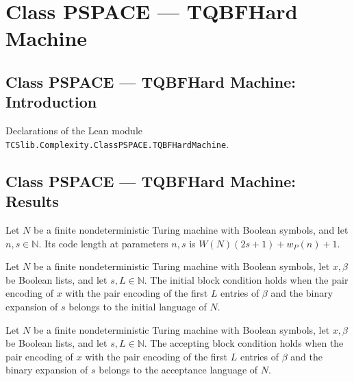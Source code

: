 \section{Class PSPACE --- TQBFHard Machine}
\subsection*{Class PSPACE --- TQBFHard Machine: Introduction}

Declarations of the Lean module \texttt{TCSlib.Complexity.ClassPSPACE.TQBFHardMachine}.

\subsection*{Class PSPACE --- TQBFHard Machine: Results}

\begin{definition}
\label{Complexity.TQBFHard.codeLen}
\leanok
{}
Let $N$ be a finite nondeterministic Turing machine with Boolean symbols, and let
$n,s\in\mathbb{N}$. Its code length at parameters $n,s$ is $W(N)(2s+1)+w_P(n)+1$.
\end{definition}

\begin{definition}
\label{Complexity.TQBFHard.blockInit}
\leanok
{}
Let $N$ be a finite nondeterministic Turing machine with Boolean symbols, let $x,\beta$
be Boolean lists, and let $s,L\in\mathbb{N}$. The initial block condition holds when the
pair encoding of $x$ with the pair encoding of the first $L$ entries of $\beta$ and the
binary expansion of $s$ belongs to the initial language of $N$.
\end{definition}

\begin{definition}
\label{Complexity.TQBFHard.blockAcc}
\leanok
{}
Let $N$ be a finite nondeterministic Turing machine with Boolean symbols, let $x,\beta$
be Boolean lists, and let $s,L\in\mathbb{N}$. The accepting block condition holds when
the pair encoding of $x$ with the pair encoding of the first $L$ entries of $\beta$ and
the binary expansion of $s$ belongs to the acceptance language of $N$.
\end{definition}

